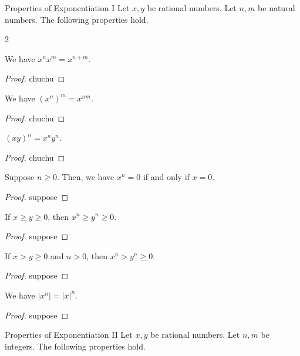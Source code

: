 \begin{problem}{Properties of Exponentiation I}
Let $x, y$ be rational numbers. Let $n, m$ be natural numbers. The following properties hold.
\end{problem}

\begin{multicols}{2}
\begin{proposition} We have $x^n x^m = x^{n + m}$.
\end{proposition}
\begin{proof}
    chuchu
\end{proof}

\begin{proposition} We have $(x^n)^m=x^{nm}.$
\end{proposition}
\begin{proof}
    chuchu
\end{proof}

\begin{proposition} $(xy)^n=x^n y^n.$
\end{proposition}
\begin{proof}
    chuchu
\end{proof}
\begin{proposition}
    Suppose $n \geq 0.$ Then, we have $x^n = 0$ if and only if $x = 0.$
\end{proposition}
\begin{proof}
    suppose
\end{proof}

\begin{proposition}
    If $x \geq y \geq 0$, then $x^n \geq y ^ n \geq 0$. 
\end{proposition}
\begin{proof}
    suppose
\end{proof}

\begin{proposition}
    If $x > y \geq 0$ and $n > 0$, then $x ^n > y^n \geq 0.$
\end{proposition}
\begin{proof}
    suppose
\end{proof}
\begin{proposition}
    We have $\lvert x^n \rvert = \lvert x \rvert ^n$.
\end{proposition}
\begin{proof}
    suppose
\end{proof}
\end{multicols}


\begin{problem}{Properties of Exponentiation II}
Let $x, y$ be rational numbers. Let $n, m$ be integers. The following properties hold.
\end{problem}


